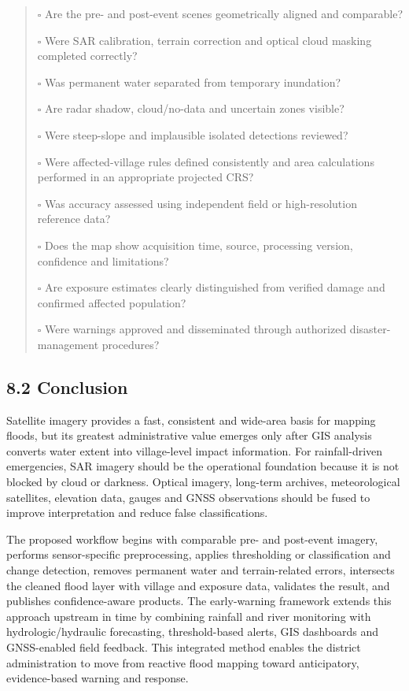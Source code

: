 \documentclass[11pt,a4paper]{article}
\begin{document}
\begin{quote}
$\square$ Are the pre- and post-event scenes geometrically aligned and comparable?

$\square$ Were SAR calibration, terrain correction and optical cloud masking completed correctly?

$\square$ Was permanent water separated from temporary inundation?

$\square$ Are radar shadow, cloud/no-data and uncertain zones visible?

$\square$ Were steep-slope and implausible isolated detections reviewed?

$\square$ Were affected-village rules defined consistently and area calculations performed in an appropriate projected CRS?

$\square$ Was accuracy assessed using independent field or high-resolution reference data?

$\square$ Does the map show acquisition time, source, processing version, confidence and limitations?

$\square$ Are exposure estimates clearly distinguished from verified damage and confirmed affected population?

$\square$ Were warnings approved and disseminated through authorized disaster-management procedures?
\end{quote}

\subsection{8.2 Conclusion}\label{conclusion}

Satellite imagery provides a fast, consistent and wide-area basis for mapping floods, but its greatest administrative value emerges only after GIS analysis converts water extent into village-level impact information. For rainfall-driven emergencies, SAR imagery should be the operational foundation because it is not blocked by cloud or darkness. Optical imagery, long-term archives, meteorological satellites, elevation data, gauges and GNSS observations should be fused to improve interpretation and reduce false classifications.

The proposed workflow begins with comparable pre- and post-event imagery, performs sensor-specific preprocessing, applies thresholding or classification and change detection, removes permanent water and terrain-related errors, intersects the cleaned flood layer with village and exposure data, validates the result, and publishes confidence-aware products. The early-warning framework extends this approach upstream in time by combining rainfall and river monitoring with hydrologic/hydraulic forecasting, threshold-based alerts, GIS dashboards and GNSS-enabled field feedback. This integrated method enables the district administration to move from reactive flood mapping toward anticipatory, evidence-based warning and response.
\end{document}
